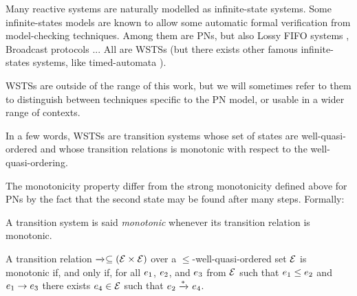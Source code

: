 
Many reactive systems are naturally modelled as infinite-state systems.
Some infinite-states models are known to allow some automatic formal verification from model-checking techniques.
Among them are \acp{PN}, but also Lossy FIFO systems \citep{Abdulla98}, Broadcast protocols \citep{Emerson98}...
All are \acp{WSTS} (but there exists other famous infinite-states systems, like timed-automata \citep{Alur94}).

\acp{WSTS} are outside of the range of this work, but we will sometimes refer to them to distinguish between techniques specific to the \ac{PN} model, or usable in a wider range of contexts.

In a few words, \acp{WSTS} are transition systems whose set of states are well-quasi-ordered and whose transition relations is monotonic with respect to the well-quasi-ordering.

The monotonicity property differ from the strong monotonicity defined above for \acp{PN} by the fact that the second state may be found after many steps. Formally:
\begin{defi}[Monotonicity]
  \label{defi:monotonicity}
  A transition system is said \emph{monotonic} whenever its transition relation is monotonic.

  A transition relation $\xrightarrow{}_{} \subseteq (\mathcal{E} \times \mathcal{E})$ over a $\leq$-well-quasi-ordered set $\mathcal{E}$ is monotonic if, and only if, for all $e_1$, $e_2$, and $e_3$ from $\mathcal{E}$ such that $e_1 \leq e_2$ and $e_1 \rightarrow e_3$ there exists $e_4 \in \mathcal{E}$ such that $e_2 \xrightarrow{*}_{} e_4$.
\end{defi}
